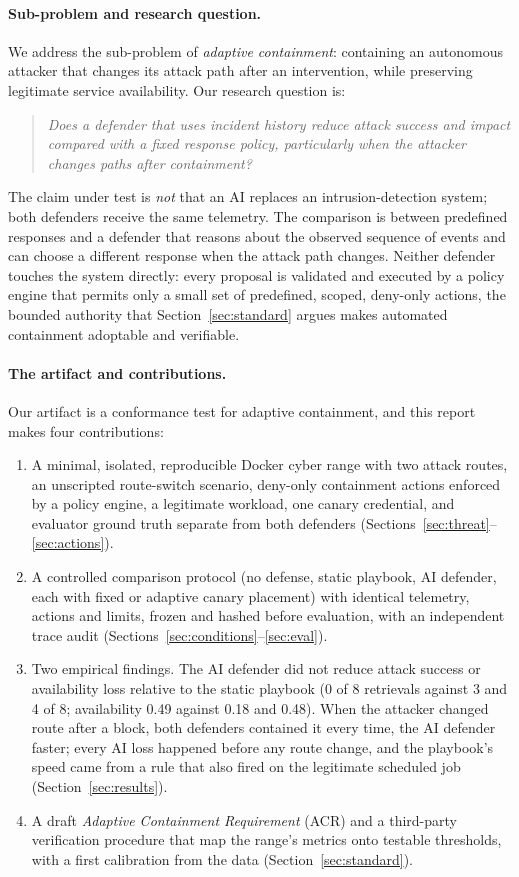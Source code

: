 \documentclass[10pt,a4paper]{article}
\begin{document}
\paragraph{Sub-problem and research question.}
We address the sub-problem of \emph{adaptive containment}: containing an autonomous attacker that changes its attack path after an intervention, while preserving legitimate service availability. Our research question is:
\begin{quote}\itshape
Does a defender that uses incident history reduce attack success and impact compared with a fixed response policy, particularly when the attacker changes paths after containment?
\end{quote}
The claim under test is \emph{not} that an AI replaces an intrusion-detection system; both defenders receive the same telemetry. The comparison is between predefined responses and a defender that reasons about the observed sequence of events and can choose a different response when the attack path changes. Neither defender touches the system directly: every proposal is validated and executed by a policy engine that permits only a small set of predefined, scoped, deny-only actions, the bounded authority that Section~\ref{sec:standard} argues makes automated containment adoptable and verifiable.

\paragraph{The artifact and contributions.}
Our artifact is a conformance test for adaptive containment, and this report makes four contributions:
\begin{enumerate}[nosep,leftmargin=*]
  \item A minimal, isolated, reproducible Docker cyber range with two attack routes, an unscripted route-switch scenario, deny-only containment actions enforced by a policy engine, a legitimate workload, one canary credential, and evaluator ground truth separate from both defenders (Sections~\ref{sec:threat}--\ref{sec:actions}).
  \item A controlled comparison protocol (no defense, static playbook, AI defender, each with fixed or adaptive canary placement) with identical telemetry, actions and limits, frozen and hashed before evaluation, with an independent trace audit (Sections~\ref{sec:conditions}--\ref{sec:eval}).
  \item Two empirical findings. The AI defender did not reduce attack success or availability loss relative to the static playbook (0 of 8 retrievals against 3 and 4 of 8; availability 0.49 against 0.18 and 0.48). When the attacker changed route after a block, both defenders contained it every time, the AI defender faster; every AI loss happened before any route change, and the playbook's speed came from a rule that also fired on the legitimate scheduled job (Section~\ref{sec:results}).
  \item A draft \emph{Adaptive Containment Requirement} (ACR) and a third-party verification procedure that map the range's metrics onto testable thresholds, with a first calibration from the data (Section~\ref{sec:standard}).
\end{enumerate}
\end{document}
